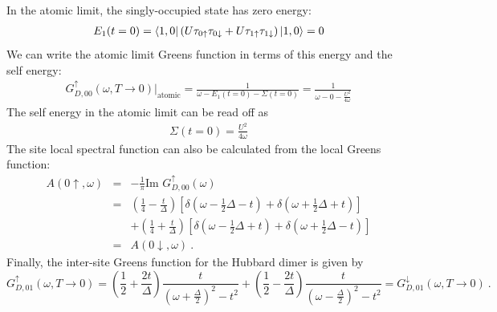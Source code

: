 \documentclass[12pt]{article}
\numberwithin{equation}{section}
\begin{document}
In the atomic limit, the singly-occupied state has zero energy:
\begin{equation}\begin{aligned}
	E_1(t=0) = \bra{1,0}\left(U \tau_{0 \uparrow}\tau_{0 \downarrow} + U \tau_{1 \uparrow}\tau_{1 \downarrow}\right) \ket{1,0} = 0
\end{aligned}\end{equation}
We can write the atomic limit Greens function in terms of this energy and the self energy:
\begin{equation}\begin{aligned}
	G_{D,00}^\uparrow(\omega, T \to 0) \bigg\vert_\text{atomic} = \frac{1}{\omega - E_1(t=0) - \Sigma(t=0)} = \frac{1}{\omega - 0 -\frac{U^2}{4\omega}}
\end{aligned}\end{equation}
The self energy in the atomic limit can be read off as 
\begin{equation}\begin{aligned}
	\label{dimer_selfenergy}
\Sigma(t=0) = \frac{U^2}{4\omega}
\end{aligned}\end{equation}
The site local spectral function can also be calculated from the local Greens function:
\begin{eqnarray}
A(0\uparrow, \omega) &=& - \frac{1}{\pi}\text{Im }G_{D,00}^\uparrow(\omega)\nonumber\\
			     &=& \left( \frac{1}{4} - \frac{t}{\Delta} \right)\left[\delta(\omega - \frac{1}{2}\Delta - t) + \delta(\omega + \frac{1}{2}\Delta + t)\right]\nonumber\\ 
			     &&+ \left( \frac{1}{4} + \frac{t}{\Delta} \right) \left[\delta(\omega - \frac{1}{2}\Delta + t) + \delta(\omega + \frac{1}{2}\Delta - t)\right]\\ 
			     &=& A(0\downarrow, \omega)~.\nonumber
\end{eqnarray}
Finally, the inter-site Greens function for the Hubbard dimer is given by
\begin{equation}
\label{dimer_intersite_G}
	G_{D,01}^\uparrow(\omega, T \to 0) = \left( \frac{1}{2} + \frac{2t}{\Delta} \right) \frac{t}{(\omega +\frac{\Delta}{2})^2 - t^2} + \left( \frac{1}{2} - \frac{2t}{\Delta} \right) \frac{t}{(\omega -\frac{\Delta}{2})^2 - t^2} = G_{D,01}^\downarrow(\omega, T \to 0)~.
\end{equation}
\end{document}
